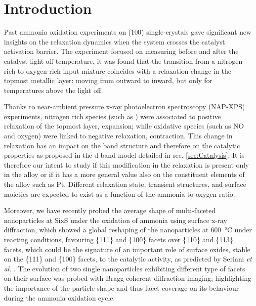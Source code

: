 \section{Introduction}

Past ammonia oxidation experiments on  (100) \parencite{Resta2020a} single-crystals gave significant new insights on the relaxation dynamics when the system crosses the catalyst activation barrier.
The experiment focused on measuring before and after the catalyst light off temperature, it was found that the transition from a nitrogen-rich to oxygen-rich input mixture coincides with a relaxation change in the topmost metallic layer: moving from outward to inward, but only for temperatures above the light off.

Thanks to near-ambient pressure x-ray photoelectron spectroscopy (NAP-XPS) experiments, nitrogen rich species (such as \nitrogen) were associated to positive relaxation of the topmost layer, expansion; while oxidative species (such as NO and oxygen) were linked to negative relaxation, contraction.
This change in relaxation has an impact on the band structure and therefore on the catalytic properties as proposed in the d-band model detailed in sec. \ref{sec:Catalysis}.
It is therefore our intent to study if this modification in the relaxation is present only in the  alloy or if it has a more general value also on the constituent elements of the alloy such as Pt.
Different relaxation state, transient structures, and surface moieties are expected to exist as a function of the ammonia to oxygen ratio.

Moreover, we have recently probed the average shape of multi-faceted nanoparticles at SixS under the oxidation of ammonia using surface x-ray diffraction, which showed a global reshaping of the nanoparticles at \qty{600}{\degreeCelsius} under reacting conditions, favouring \{111\} and \{100\} facets over \{110\} and \{113\} facets, which could be the signature of an important role of surface oxides, stable on the \{111\} and \{100\} facets, to the catalytic activity, as predicted by Seriani \textit{et al.} \parencite*{Seriani2008}.
The evolution of two single nanoparticles exhibiting different type of facets on their surface was probed with Bragg coherent diffraction imaging, highlighting the importance of the particle shape and thus facet coverage on its behaviour during the ammonia oxidation cycle.

